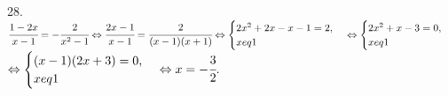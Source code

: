 28. $\cfrac{1-2x}{x-1}=-\cfrac{2}{x^2-1}\Leftrightarrow\cfrac{2x-1}{x-1}=\cfrac{2}{(x-1)(x+1)}\Leftrightarrow \begin{cases} 2x^2+2x-x-1=2,\\ x
eq1\end{cases}
\Leftrightarrow \begin{cases} 2x^2+x-3=0,\\ x
eq1\end{cases}$\\$\Leftrightarrow \begin{cases} (x-1)(2x+3)=0,\\ x
eq1\end{cases}\Leftrightarrow x=-\cfrac{3}{2}.$\\
